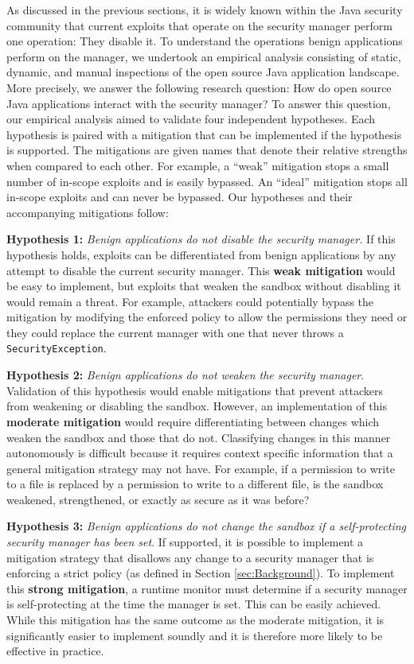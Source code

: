 \documentclass{sig-alternate}
\begin{document}
As discussed in the previous sections, it is widely known within the
Java security community that current exploits that operate on the
security manager perform one operation: They disable it. To understand
the operations benign applications perform on the manager, we undertook
an empirical analysis consisting of static, dynamic, and manual inspections
of the open source Java application landscape. More precisely, we
answer the following research question: How do open source Java applications
interact with the security manager? To answer this question, our empirical
analysis aimed to validate four independent hypotheses. Each hypothesis
is paired with a mitigation that can be implemented if the hypothesis
is supported. The mitigations are given names that denote their relative
strengths when compared to each other. For example, a ``weak'' mitigation
stops a small number of in-scope exploits and is easily bypassed.
An ``ideal'' mitigation stops all in-scope exploits and can never
be bypassed. Our hypotheses and their accompanying mitigations follow: 

\textbf{Hypothesis 1:} \emph{Benign applications do not disable
the security manager.} If this hypothesis holds, exploits can be differentiated
from benign applications by any attempt to disable the current security
manager. This \textbf{weak mitigation} would be easy to implement,
but exploits that weaken the sandbox without disabling it would remain
a threat. For example, attackers could potentially bypass the mitigation
by modifying the enforced policy to allow the permissions they need
or they could replace the current manager with one that never throws
a \texttt{SecurityException}.

\textbf{Hypothesis 2:} \emph{Benign applications do not weaken the
security manager}. Validation of this hypothesis would enable
mitigations that prevent attackers from weakening or disabling the
sandbox. However, an implementation of this \textbf{moderate mitigation}
would require differentiating between changes which weaken the sandbox
and those that do not. Classifying changes in this manner autonomously is difficult
because it requires context specific information that a general mitigation
strategy may not have. For example, if a permission to write to a
file is replaced by a permission to write to a different file, is
the sandbox weakened, strengthened, or exactly as secure as it was
before?

\textbf{Hypothesis 3:} \emph{Benign applications do not change the
sandbox if a self-protecting security manager has been set}. If supported,
it is possible to implement a mitigation strategy that disallows any
change to a security manager that is enforcing a strict policy (as
defined in Section \ref{sec:Background}). To implement this \textbf{strong
mitigation}, a runtime monitor must determine if a security manager
is self-protecting at the time the manager is set. This can be easily
achieved. While this mitigation has the same outcome as the moderate
mitigation, it is significantly easier to implement soundly and it
is therefore more likely to be effective in practice. 
\end{document}
